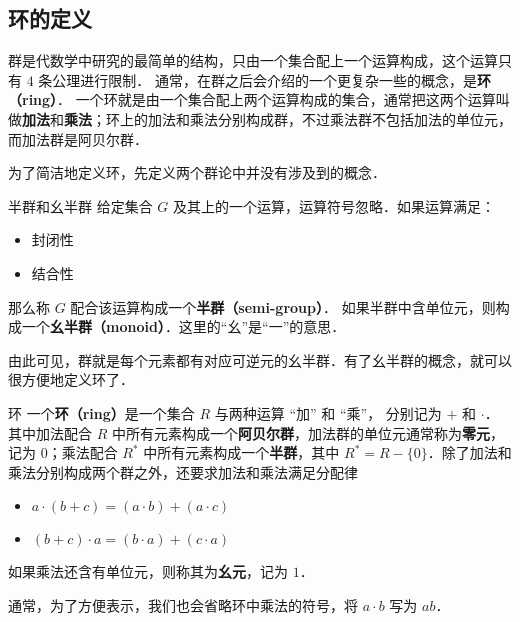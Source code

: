 


\subsection{环的定义}
群是代数学中研究的最简单的结构，只由一个集合配上一个运算构成，这个运算只有 $4$ 条公理进行限制． 通常，在群之后会介绍的一个更复杂一些的概念，是\textbf{环（ring）}． 一个环就是由一个集合配上两个运算构成的集合，通常把这两个运算叫做\textbf{加法}和\textbf{乘法}；环上的加法和乘法分别构成群，不过乘法群不包括加法的单位元，而加法群是阿贝尔群．

为了简洁地定义环，先定义两个群论中并没有涉及到的概念．

\begin{definition}{半群和幺半群}\label{Ring_def1}
给定集合 $G$ 及其上的一个运算，运算符号忽略．如果运算满足：
\begin{itemize}
\item 封闭性
\item 结合性
\end{itemize}
那么称 $G$ 配合该运算构成一个\textbf{半群（semi-group）}．
如果半群中含单位元，则构成一个\textbf{幺半群（monoid）}．这里的“幺”是“一”的意思．
\end{definition}

由此可见，群就是每个元素都有对应可逆元的幺半群．有了幺半群的概念，就可以很方便地定义环了．

\begin{definition}{环}\label{Ring_def2}
一个\textbf{环（ring）}是一个集合 $R$ 与两种运算 “加” 和 “乘”， 分别记为 $+$ 和 $\cdot$． 其中加法配合 $R$ 中所有元素构成一个\textbf{阿贝尔群}，加法群的单位元通常称为\textbf{零元}，记为 $0$；乘法配合 $R^*$ 中所有元素构成一个\textbf{半群}，其中 $R^*=R-\{0\}$．除了加法和乘法分别构成两个群之外，还要求加法和乘法满足分配律
\begin{itemize}
\item $a \cdot (b + c) = (a \cdot b) + (a \cdot c)$
\item $(b + c) \cdot a = (b \cdot a) + (c \cdot a)$
\end{itemize}
如果乘法还含有单位元，则称其为\textbf{幺元}，记为 $1$．
\end{definition}

通常，为了方便表示，我们也会省略环中乘法的符号，将 $a\cdot b$ 写为 $ab$．

